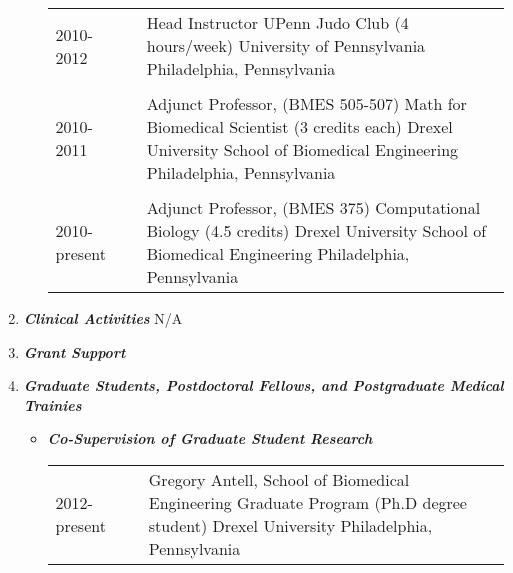 \documentclass[a4paper,11pt]{article}
\begin{document}
\begin{enumerate}
\begin{itemize}
\begin{longtable}{p{}p{}p{}}
  \\
  2010-2012 & & Head Instructor \newline UPenn Judo Club (4 hours/week) \newline University of Pennsylvania \newline Philadelphia, Pennsylvania \\
  \\
  2010-2011 & & Adjunct Professor, (BMES 505-507) \newline Math for Biomedical Scientist (3 credits each) \newline Drexel University School of Biomedical Engineering \newline Philadelphia, Pennsylvania \\
  \\
  2010-present & & Adjunct Professor, (BMES 375) \newline Computational Biology (4.5 credits) \newline Drexel University School of Biomedical Engineering \newline Philadelphia, Pennsylvania \\
  \end{longtable}
 \end{itemize}
 \item {\LARGE \itshape \bfseries Clinical Activities} \newline
 N/A
 \item {\LARGE \itshape \bfseries Grant Support}
 \item {\LARGE \itshape \bfseries Graduate Students, Postdoctoral Fellows, and Postgraduate Medical Trainies}
 \begin{itemize}
  \item[] {\Large \bfseries \itshape Co-Supervision of Graduate Student Research}
    \begin{longtable}{p{}p{}p{}}
  2012-present & & Gregory Antell, School of Biomedical Engineering \newline Graduate Program (Ph.D degree student) \newline Drexel University \newline Philadelphia, Pennsylvania
  \end{longtable}
 \end{itemize}


\end{enumerate}
\end{document}
